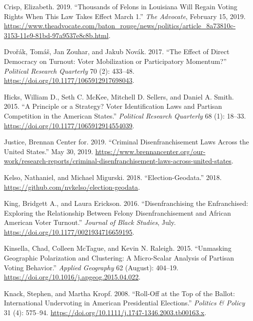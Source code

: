 \documentclass[
  12pt,
]{article}
\newlength{\cslhangindent}
\newenvironment{cslreferences}%
  {\setlength{\parindent}{0pt}%
  \everypar{\setlength{\hangindent}{\cslhangindent}}\ignorespaces}%
  {\par}
\begin{document}
\begin{cslreferences}
\leavevmode\hypertarget{ref-Crisp2019}{}%
Crisp, Elizabeth. 2019. ``Thousands of Felons in Louisiana Will Regain Voting Rights When This Law Takes Effect March 1.'' \emph{The Advocate}, February 15, 2019. \url{https://www.theadvocate.com/baton_rouge/news/politics/article_8a73810c-3153-11e9-81bd-97a9537e8c8b.html}.

\leavevmode\hypertarget{ref-Dvorak2017}{}%
Dvořák, Tomáš, Jan Zouhar, and Jakub Novák. 2017. ``The Effect of Direct Democracy on Turnout: Voter Mobilization or Participatory Momentum?'' \emph{Political Research Quarterly} 70 (2): 433--48. \url{https://doi.org/10.1177/1065912917698043}.

\leavevmode\hypertarget{ref-Hicks2015}{}%
Hicks, William D., Seth C. McKee, Mitchell D. Sellers, and Daniel A. Smith. 2015. ``A Principle or a Strategy? Voter Identification Laws and Partisan Competition in the American States.'' \emph{Political Research Quarterly} 68 (1): 18--33. \url{https://doi.org/10.1177/1065912914554039}.

\leavevmode\hypertarget{ref-bcj_laws}{}%
Justice, Brennan Center for. 2019. ``Criminal Disenfranchisement Laws Across the United States.'' May 30, 2019. \url{https://www.brennancenter.org/our-work/research-reports/criminal-disenfranchisement-laws-across-united-states}.

\leavevmode\hypertarget{ref-Kelso2018}{}%
Kelso, Nathaniel, and Michael Migurski. 2018. ``Election-Geodata.'' 2018. \url{https://github.com/nvkelso/election-geodata}.

\leavevmode\hypertarget{ref-King2016}{}%
King, Bridgett A., and Laura Erickson. 2016. ``Disenfranchising the Enfranchised: Exploring the Relationship Between Felony Disenfranchisement and African American Voter Turnout.'' \emph{Journal of Black Studies}, July. \url{https://doi.org/10.1177/0021934716659195}.

\leavevmode\hypertarget{ref-Kinsella2015}{}%
Kinsella, Chad, Colleen McTague, and Kevin N. Raleigh. 2015. ``Unmasking Geographic Polarization and Clustering: A Micro-Scalar Analysis of Partisan Voting Behavior.'' \emph{Applied Geography} 62 (August): 404--19. \url{https://doi.org/10.1016/j.apgeog.2015.04.022}.

\leavevmode\hypertarget{ref-Knack2008}{}%
Knack, Stephen, and Martha Kropf. 2008. ``Roll-Off at the Top of the Ballot: International Undervoting in American Presidential Elections.'' \emph{Politics \& Policy} 31 (4): 575--94. \url{https://doi.org/10.1111/j.1747-1346.2003.tb00163.x}.


\end{cslreferences}
\end{document}
